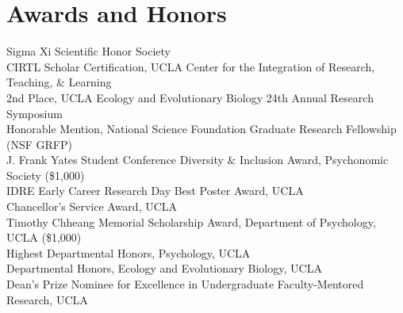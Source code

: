 \section*{Awards and Honors}
Sigma Xi Scientific Honor Society\\
CIRTL Scholar Certification, UCLA Center for the Integration of Research, Teaching, \& Learning\\
2nd Place, UCLA Ecology and Evolutionary Biology 24th Annual Research Symposium\\
Honorable Mention, National Science Foundation Graduate Research Fellowship (NSF GRFP)\\
J. Frank Yates Student Conference Diversity \& Inclusion Award, Psychonomic Society (\$1,000)\\
IDRE Early Career Research Day Best Poster Award, UCLA\\
Chancellor's Service Award, UCLA\\
Timothy Chheang Memorial Scholarship Award, Department of Psychology, UCLA (\$1,000)\\
Highest Departmental Honors, Psychology, UCLA\\
Departmental Honors, Ecology and Evolutionary Biology, UCLA\\
Dean's Prize Nominee for Excellence in Undergraduate Faculty-Mentored Research, UCLA
